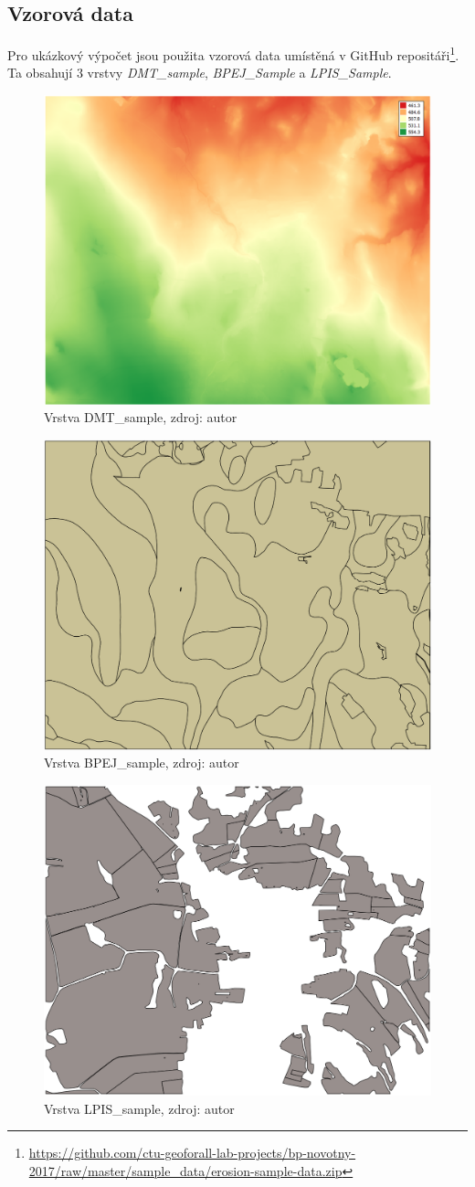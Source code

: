 \subsection{Vzorová data} Pro ukázkový výpočet jsou použita vzorová
data umístěná v GitHub repositáři\footnote{\url{https://github.com/ctu-geoforall-lab-projects/bp-novotny-2017/raw/master/sample_data/erosion-sample-data.zip}}. Ta obsahují 3 vrstvy \textit{DMT\_sample}, \textit{BPEJ\_Sample}
a \textit{LPIS\_Sample}.
\begin{figure}[H] \centering
		\includegraphics[width=.4\textwidth]{./pictures/dmt_layer1.png}
		\caption[Vrstva DMT\_sample]{Vrstva DMT\_sample,
zdroj: autor}
		\label{dmt_sample}
\end{figure}
\begin{figure}[H] \centering
		\includegraphics[width=.4\textwidth]{./pictures/bpej_layer1.png}
		\caption[Vrstva BPEJ\_sample]{Vrstva BPEJ\_sample,
zdroj: autor}
		\label{bpej_sample}
\end{figure}
\begin{figure}[H] \centering
		\includegraphics[width=.4\textwidth]{./pictures/lpis_layer1.png}
		\caption[Vrstva LPIS\_sample]{Vrstva LPIS\_sample,
zdroj: autor}
		\label{lpis_sample}
\end{figure}
